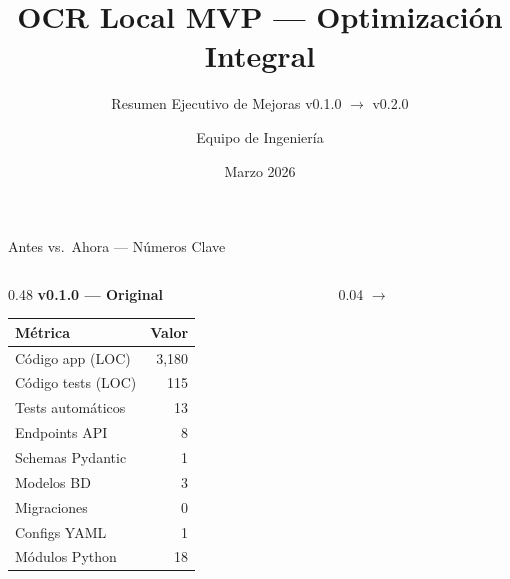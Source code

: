 \documentclass[aspectratio=169,10pt]{beamer}
\title{\textbf{OCR Local MVP --- Optimizaci\'on Integral}}
\subtitle{Resumen Ejecutivo de Mejoras v0.1.0 $\to$ v0.2.0}
\author{Equipo de Ingenier\'ia}
\date{Marzo 2026}
\begin{document}
\begin{frame}
\titlepage
\end{frame}

\begin{frame}{Antes vs.\ Ahora --- N\'umeros Clave}

\begin{columns}[T]
\begin{column}{0.48\textwidth}
\centering
{\large\textbf{v0.1.0 --- Original}}\\[6pt]
\begin{tabular}{lr}
\toprule
\textbf{M\'etrica} & \textbf{Valor} \\
\midrule
C\'odigo app (LOC)       & 3{,}180 \\
C\'odigo tests (LOC)     & 115 \\
Tests autom\'aticos      & 13 \\
Endpoints API            & 8 \\
Schemas Pydantic         & 1 \\
Modelos BD               & 3 \\
Migraciones              & 0 \\
Configs YAML             & 1 \\
M\'odulos Python         & 18 \\
\bottomrule
\end{tabular}
\end{column}

\begin{column}{0.04\textwidth}
\centering
\vspace{40pt}
{\Huge $\to$}
\end{column}


\end{columns}
\end{frame}
\end{document}
